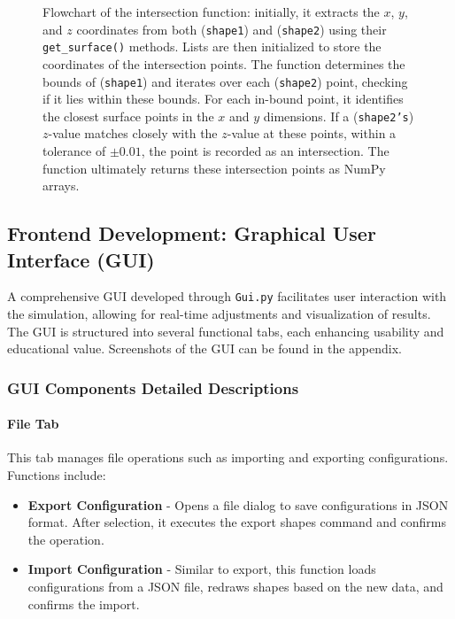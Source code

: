 \documentclass[../main.tex]{subfiles}
\begin{document}
\begin{figure}[H]
\begin{tikzpicture}[scale=0.75, transform shape, node distance=1cm, auto]
    \end{tikzpicture}
    \vspace{-8pt}
    \caption{Flowchart of the intersection function: initially, it extracts the $x$, $y$, and $z$ coordinates from both (\texttt{shape1}) and (\texttt{shape2}) using their \texttt{get\_surface()} methods. Lists are then initialized to store the coordinates of the intersection points. The function determines the bounds of (\texttt{shape1}) and iterates over each (\texttt{shape2}) point, checking if it lies within these bounds. For each in-bound point, it identifies the closest surface points in the $x$ and $y$ dimensions. If a (\texttt{shape2's}) $z$-value matches closely with the $z$-value at these points, within a tolerance of $\pm0.01$, the point is recorded as an intersection. The function ultimately returns these intersection points as NumPy arrays.
    }
    \label{fig:flowchart1}
\end{figure}

\vspace{-25pt}
\subsection{Frontend Development: Graphical User Interface (GUI)}
\vspace{-15pt}
A comprehensive GUI developed through \texttt{Gui.py} facilitates user interaction with the simulation, allowing for real-time adjustments and visualization of results. The GUI is structured into several functional tabs, each enhancing usability and educational value. Screenshots of the GUI can be found in the appendix.
\vspace{-15pt}
\subsubsection{GUI Components Detailed Descriptions}
\vspace{-8pt}
\paragraph{File Tab}
This tab manages file operations such as importing and exporting configurations. Functions include:
\begin{itemize}
    \setlength{\itemsep}{0.1mm}
    \item \textbf{Export Configuration} - Opens a file dialog to save configurations in JSON format. After selection, it executes the export shapes command and confirms the operation.
    \item \textbf{Import Configuration} - Similar to export, this function loads configurations from a JSON file, redraws shapes based on the new data, and confirms the import.
\end{itemize}
\vspace{-15pt}
\end{document}
